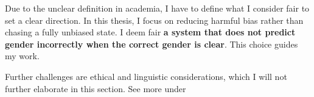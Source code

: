Due to the unclear definition in academia, I have to define what I consider fair to set a clear direction. In this thesis, I focus on reducing harmful bias rather than chasing a fully unbiased state. I deem fair \textbf{a system that does not predict gender incorrectly when the correct gender is clear}. This choice guides my work.

Further challenges are ethical and linguistic considerations, which I will not further elaborate in this section. See more under %
